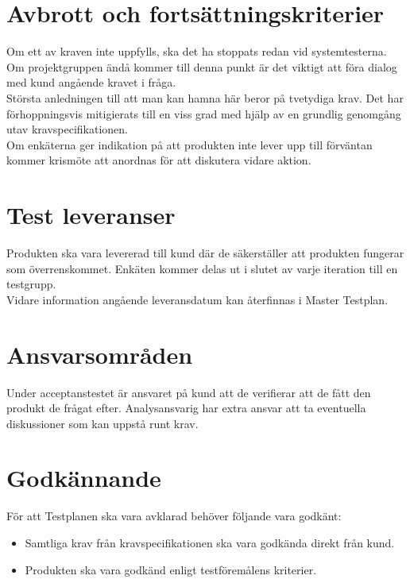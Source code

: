 \section{Avbrott och fortsättningskriterier}
	Om ett av kraven inte uppfylls, ska det ha stoppats redan vid systemtesterna. Om projektgruppen ändå kommer till denna punkt är det viktigt att föra dialog med kund angående kravet i fråga.\\
	
	Största anledningen till att man kan hamna här beror på tvetydiga krav. Det har förhoppningsvis mitigierats till en viss grad med hjälp av en grundlig genomgång utav kravspecifikationen.\\

	Om enkäterna ger indikation på att produkten inte lever upp till förväntan kommer krismöte att anordnas för att diskutera vidare aktion.


\section{Test leveranser }
	Produkten ska vara levererad till kund där de säkerställer att produkten fungerar som överrenskommet. Enkäten kommer delas ut i slutet av varje iteration till en testgrupp.\\

	Vidare information angående leveransdatum kan återfinnas i Master Testplan.



\section{Ansvarsområden}
	Under acceptanstestet är ansvaret på kund att de verifierar att de fått den produkt de frågat efter. Analysansvarig har extra ansvar att ta eventuella diskussioner som kan uppstå runt krav.






\section{Godkännande}
	För att Testplanen ska vara avklarad behöver följande vara godkänt:
	\begin{itemize}
	 \item Samtliga krav från kravspecifikationen ska vara godkända direkt från kund.
	\item Produkten ska vara godkänd enligt testföremålens kriterier.
	\end{itemize}



\printbibliography





